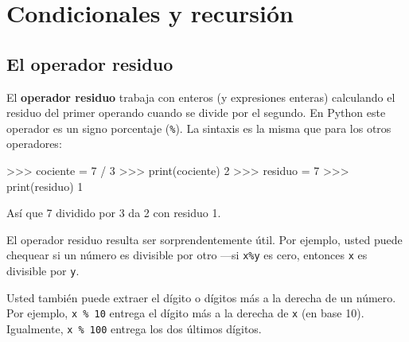 

\chapter{Condicionales y recursión}

\section{El operador residuo}

El {\bf operador residuo} trabaja con enteros (y expresiones enteras)
calculando el residuo del primer operando cuando se divide por el segundo.
En Python este operador es un signo porcentaje ({\tt\%}). 
La sintaxis es la misma que para los otros operadores:

\beforeverb
\begin{pyconcode}
>>> cociente = 7 / 3
>>> print(cociente)
2
>>> residuo = 7 %
>>> print(residuo)
1
\end{pyconcode}
\afterverb
%

Así que 7 dividido por 3 da 2 con residuo 1.

El operador residuo resulta ser sorprendentemente útil. Por ejemplo,
usted puede chequear si un número es divisible por otro ---si
\texttt{x\%y} es cero, entonces \texttt{x} es divisible por \texttt{y}.

Usted también puede extraer el dígito o dígitos más a la derecha
de un número. Por ejemplo, \texttt{x \% 10} entrega el dígito más a la derecha
de  \texttt{x} (en base 10).  Igualmente, \texttt{x \% 100}
entrega los dos últimos dígitos.

